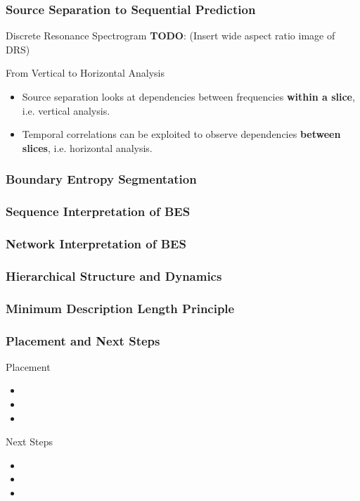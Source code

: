 \begin{frame}
  \frametitle{Source Separation to Sequential Prediction}
  \begin{block}{Discrete Resonance Spectrogram}
    \textbf{TODO}: (Insert wide aspect ratio image of DRS)
  \end{block}
  \begin{block}{From Vertical to Horizontal Analysis}
    \begin{itemize}
      \item Source separation looks at dependencies between frequencies \textbf{within a slice}, i.e. vertical analysis.
      \item Temporal correlations can be exploited to observe dependencies \textbf{between slices}, i.e. horizontal analysis.
    \end{itemize}
  \end{block}
\end{frame}

\begin{frame}
  \frametitle{Boundary Entropy Segmentation}
\end{frame}

\begin{frame}
  \frametitle{Sequence Interpretation of BES}
\end{frame}

\begin{frame}
  \frametitle{Network Interpretation of BES}
\end{frame}

\begin{frame}
  \frametitle{Hierarchical Structure and Dynamics}
\end{frame}

\begin{frame}
  \frametitle{Minimum Description Length Principle}
\end{frame}

\begin{frame}
  \frametitle{Placement and Next Steps}
  \begin{block}{Placement}
    \begin{itemize}
      \item 
      \item 
      \item 
    \end{itemize}
  \end{block}
  \begin{block}{Next Steps}
    \begin{itemize}
      \item 
      \item
      \item
    \end{itemize}
  \end{block}
\end{frame}


